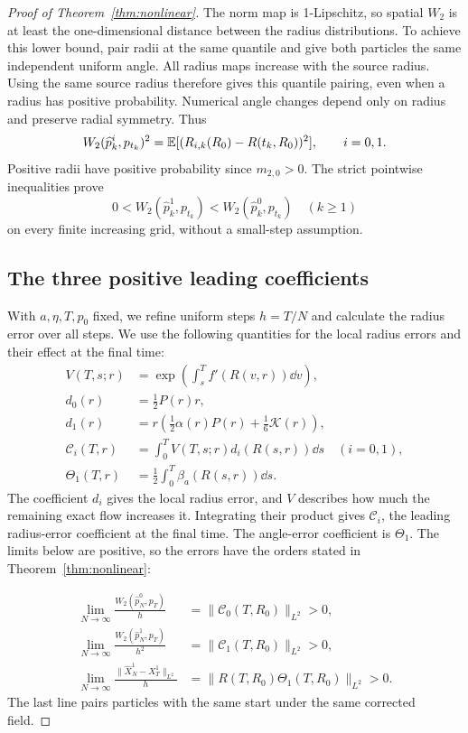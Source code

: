 \begin{proof}[Proof of Theorem~\ref{thm:nonlinear}]
The norm map is 1-Lipschitz, so spatial $W_2$ is at least the one-dimensional distance between the radius distributions. To achieve this lower bound, pair radii at the same quantile and give both particles the same independent uniform angle. All radius maps increase with the source radius. Using the same source radius therefore gives this quantile pairing, even when a radius has positive probability. Numerical angle changes depend only on radius and preserve radial symmetry. Thus
\begin{equation}
 W_2(\widehat p_k^{i},p_{t_k})^2
 =\mathbb E[(R_{i,k}(R_0)-R(t_k,R_0))^2],\qquad i=0,1.
 \label{eq:radial-transport-full}
\end{equation}
Positive radii have positive probability since $m_{2,0}>0$. The strict pointwise inequalities prove
\[
 0<W_2(\widehat p_k^{1},p_{t_k})<W_2(\widehat p_k^{0},p_{t_k})
 \quad(k\ge1)
\]
on every finite increasing grid, without a small-step assumption.

\subsection{The three positive leading coefficients}

With $a,\eta,T,p_0$ fixed, we refine uniform steps $h=T/N$ and calculate the radius error over all steps. We use the following quantities for the local radius errors and their effect at the final time:
\begin{align*}
 V(T,s;r)&=\exp\left(\int_s^T f'(R(v,r))\dd v\right),\\
 d_0(r)&=\tfrac12P(r)r,\\
 d_1(r)&=r\left(\tfrac12\alpha(r)P(r)+\tfrac16\mathcal K(r)\right),\\
 \mathcal C_i(T,r)&=\int_0^T V(T,s;r)d_i(R(s,r))\dd s\quad(i=0,1),\\
 \Theta_1(T,r)&=\tfrac12\int_0^T\beta_a(R(s,r))\dd s.
\end{align*}
The coefficient $d_i$ gives the local radius error, and $V$ describes how much the remaining exact flow increases it. Integrating their product gives $\mathcal C_i$, the leading radius-error coefficient at the final time. The angle-error coefficient is $\Theta_1$. The limits below are positive, so the errors have the orders stated in Theorem~\ref{thm:nonlinear}:

\begin{align}
 \lim_{N\to\infty}\frac{W_2(\widehat p_N^{0},p_T)}h
 &=\|\mathcal C_0(T,R_0)\|_{L^2}>0,\label{eq:nonlinear-base-limit}\\
 \lim_{N\to\infty}\frac{W_2(\widehat p_N^{1},p_T)}{h^2}
 &=\|\mathcal C_1(T,R_0)\|_{L^2}>0,\label{eq:nonlinear-corrected-limit}\\
 \lim_{N\to\infty}\frac{\|\widehat X_N^{1}-X_T^{1}\|_{L^2}}h
 &=\|R(T,R_0)\Theta_1(T,R_0)\|_{L^2}>0.
 \label{eq:nonlinear-particle-limit}
\end{align}
The last line pairs particles with the same start under the same corrected field.


\end{proof}
